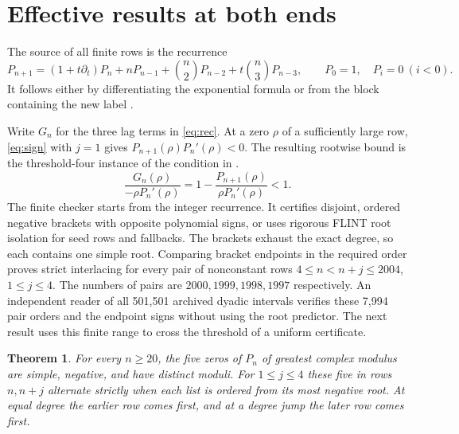 \documentclass[11pt]{article}
\newtheorem{theorem}{Theorem}
\begin{document}
\section{Effective results at both ends}\label{sec:effective}

The source of all finite rows is the recurrence
\begin{equation}\label{eq:rec}
 P_{n+1}=(1+t\partial_t)P_n+nP_{n-1}
          +\binom n2 P_{n-2}+t\binom n3 P_{n-3},
 \qquad P_0=1,\quad P_i=0\ (i<0).
\end{equation}
It follows either by differentiating the exponential formula or from the block containing the new label \cite[Thm.~3.3]{zhan}.

Write \(G_n\) for the three lag terms in \eqref{eq:rec}. At a zero \(\rho\) of a sufficiently large row, \eqref{eq:sign} with \(j=1\) gives \(P_{n+1}(\rho)P_n'(\rho)<0\). The resulting rootwise bound is the threshold-four instance of the condition in \cite{rrreachable}.
\[
 \frac{G_n(\rho)}{-\rho P_n'(\rho)}
 =1-\frac{P_{n+1}(\rho)}{\rho P_n'(\rho)}<1.
\]
The finite checker starts from the integer recurrence. It certifies disjoint, ordered negative brackets with opposite polynomial signs, or uses rigorous FLINT root isolation for seed rows and fallbacks. The brackets exhaust the exact degree, so each contains one simple root. Comparing bracket endpoints in the required order proves strict interlacing for every pair of nonconstant rows \(4\le n<n+j\le2004\), \(1\le j\le4\). The numbers of pairs are \(2000,1999,1998,1997\) respectively. An independent reader of all 501,501 archived dyadic intervals verifies these 7,994 pair orders and the endpoint signs without using the root predictor. The next result uses this finite range to cross the threshold of a uniform certificate.

\begin{theorem}\label{thm:outereffective}
For every \(n\ge20\), the five zeros of \(P_n\) of greatest complex modulus are simple, negative, and have distinct moduli. For \(1\le j\le4\) these five in rows \(n,n+j\) alternate strictly when each list is ordered from its most negative root. At equal degree the earlier row comes first, and at a degree jump the later row comes first.
\end{theorem}
\end{document}
